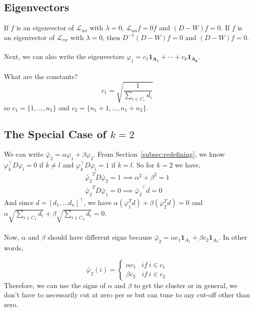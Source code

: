 \documentclass[12pt]{article}
\theoremstyle{plain}
\begin{document}
\subsection{Eigenvectors}

If $ f $ is an eigenvector of $ \mathcal{L}_{un} $ with $ \lambda = 0 $, $ \mathcal{L}_{un} f = 0 \dot f $ and $ (D - W)f = 0 $.
If $ f $ is an eigenvector of $ \mathcal{L}_{rw} $ with $ \lambda = 0 $, then $ D^{-1} (D - W) f = 0 $ and $ (D - W)f = 0 $.
\\ \\
Next, we can also write the eigenvectors $ \varphi_{1} = c_1 \mathbf{1_{A_{1}}} + \cdots + c_k \mathbf{1_{A_{k}}} $.
\\ \\
What are the constants?
\[
c_1 = \sqrt{\frac{1}{\sum_{i \in C_1}d_i}}
\]
so $ c_1 = \{ 1, \ldots, n_1 \} $ and $ c_2 = \{ n_1 + 1, \ldots, n_1 + n_2 \} $.

\subsection{The Special Case of $ k = 2$}

We can write $ \widetilde{\varphi_2} = \alpha \varphi_{1}  + \beta \varphi_{2} $.
From Section~\ref{subsec:redefining}, we know $ \varphi_k^{\intercal} D \varphi_l = 0 $ if $ k \neq l $ and $ \varphi_k^{\intercal} D \varphi_l = 1 $ if $ k = l $. So for $k=2$ we have,
\begin{align*}
\widetilde{\varphi_2}^T D \widetilde{\varphi_2} = 1 \implies \alpha^2 + \beta^2 = 1 \\
\widetilde{\varphi_2}^T D \widetilde{\varphi_1} = 0 \implies \widetilde{\varphi_2}^{\intercal}d = 0
\end{align*}
And since $ d = [d_1, \ldots d_n]^{\intercal} $, we have $ \alpha(\varphi_{1}^Td) + \beta(\varphi_{2}^Td) = 0$ and $\alpha\sqrt{\sum_{i \in C_1}d_i}+\beta\sqrt{\sum_{i \in C_2}d_i} = 0$.
\\ \\
Now, $ \alpha $ and $ \beta $ should have different signs because $ \widetilde{\varphi_2} = \alpha c_1 \mathbf{1}_{A_1} + \beta c_2 \mathbf{1}_{A_2} $. In other words,

\[
\widetilde{\varphi_2} (i) =
\begin{cases}
  \alpha c_1 & if~ i \in c_1 \\
  \beta c_2 & if~ i \in c_2
\end{cases}
\]
Therefore, we can use the signs of $\alpha$ and $\beta$ to get the cluster or in general, we don't have to necessarily cut at zero per se but can tune to any cut-off other than zero.
\end{document}
